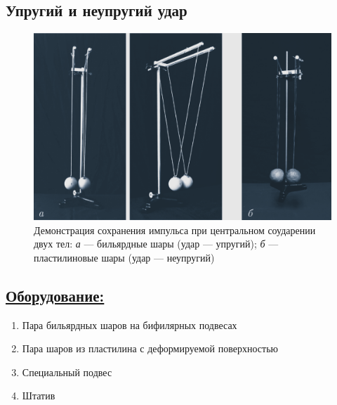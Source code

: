 \documentclass[14pt,a4paper,oneside]{extarticle}	%
\begin{document}
	
	
	\begin{center}
		\subsection*{Упругий и неупругий удар}
	\end{center}
	
	\begin{figure}[H] 	%
		\centering 	
		\includegraphics[width=0.9\linewidth]{hit-1.png}
		\caption{Демонстрация сохранения импульса при центральном соударении двух тел: \textit{а} — бильярдные шары (удар — упругий); \textit{б} — пластилиновые шары (удар — неупругий)}
		\label{hit-1}
	\end{figure}
	
	\subsection*{\underline{Оборудование:}}
	
	\begin{enumerate} 
		\item Пара бильярдных шаров на бифилярных подвесах 
		\item Пара шаров из пластилина с деформируемой поверхностью
		\item Специальный подвес
		\item Штатив
	\end{enumerate}
\end{document}
